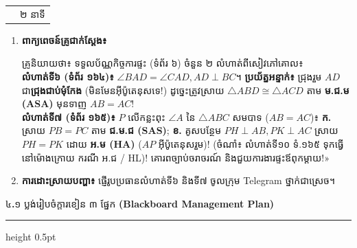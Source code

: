 \documentclass[a4paper,12pt]{article}
\makeatletter
\newcommand{\en}[1]{{\TimesEn #1}}
\newcommand{\enbf}[1]{{\TimesEn\textbf{#1}}}
\newcommand{\tri}[1]{\ensuremath{\triangle #1}}
\newcommand{\ang}[1]{\ensuremath{\angle #1}}
\newcommand{\cg}{\ensuremath{\cong}}
\newcommand{\subsectitle}[1]{{\muol\fontsize{11pt}{14.5pt}\selectfont #1}}
\newcommand{\subsec}[1]{%
  \needspace{1.6cm}%
  \vspace{4pt}%
  \subsectitle{#1}\par
  \vspace{2pt}\hrule height 0.5pt\vspace{3pt}%
}
\newenvironment{phasebox}[3]{%
  \par\needspace{2.4cm}%
  \begin{tcolorbox}[
    enhanced, sharp corners, colback=headgray, colframe=black,
    boxrule=1.0pt, top=3.5pt, bottom=3.5pt, left=8pt, right=8pt,
    before skip=5pt, after skip=3pt
  ]
    \linespread{1.0}\selectfont\renewcommand{\arraystretch}{1.0}%
    \begin{tabular*}{\linewidth}{@{}>{\raggedright\arraybackslash}p{13.10cm}@{\extracolsep{\fill}}r@{}}
      {\muol\fontsize{11pt}{14.5pt}\selectfont #1} & {\fontsize{10.5pt}{13.5pt}\selectfont\en{#2 |} #3}%
    \end{tabular*}%
  \end{tcolorbox}%
  \begingroup\fontsize{11.5pt}{14.92pt}\selectfont
}{%
  \par\endgroup
  \vspace{3pt}{\color{black}\hrule height 0.75pt}\vspace{5pt}%
}
\makeatother
\begin{document}
\begin{phasebox}{ជំហានទី ៥៖ កិច្ចការផ្ទះ \enbf{\#6, \#7} និងបណ្ដាំផ្ញើ}{48--50 min}{២ នាទី}
  \begin{enumerate}[leftmargin=0.45cm, topsep=1.5pt, itemsep=2.2pt, parsep=0pt]
    \item \textbf{ពាក្យពេចន៍គ្រូជាក់ស្ដែង៖}
      \begin{scriptbox}
        {\muol\fontsize{10.8pt}{14.5pt}\selectfont \enbf{«}គ្រូនិយាយថា៖} ទទួលប័ណ្ណកិច្ចការផ្ទះ (ទំព័រ ៦) ចំនួន ២ លំហាត់ពីសៀវភៅគោល៖\\
        \textbf{លំហាត់ទី៦ (ទំព័រ ១៦៤)៖} $\ang{BAD}=\ang{CAD}, AD\perp BC$។ \textbf{ប្រយ័ត្នអន្ទាក់៖} ជ្រុងរួម $AD$ ជា\textbf{ជ្រុងជាប់មុំកែង} (មិនមែនអ៊ីប៉ូតេនុសទេ!) ដូច្នេះត្រូវស្រាយ $\tri{ABD}\cg\tri{ACD}$ តាម \textbf{ម.ជ.ម (\en{ASA})} មុនទាញ $AB=AC$!\\
        \textbf{លំហាត់ទី៧ (ទំព័រ ១៦៥)៖} $P$ លើកន្លះពុះ $\ang{A}$ នៃ $\tri{ABC}$ សមបាទ ($AB=AC$)៖ \textbf{ក.} ស្រាយ $PB=PC$ តាម \textbf{ជ.ម.ជ (\en{SAS})}; \textbf{ខ.} គូសបន្ថែម $PH\perp AB, PK\perp AC$ ស្រាយ $PH=PK$ ដោយ \textbf{អ.ម (\en{HA})} ($AP$ អ៊ីប៉ូតេនុសរួម)! (ចំណាំ៖ លំហាត់ទី១០ ទំ.១៦៥ ទុកធ្វើនៅម៉ោងក្រោយ ករណី អ.ជ / \en{HL})! គោរពច្បាប់ចរាចរណ៍ និងជួយការងារផ្ទះឪពុកម្ដាយ!»
      \end{scriptbox}
    \item \textbf{ការដោះស្រាយបញ្ហា៖} ផ្ញើរូបប្រធានលំហាត់ទី៦ និងទី៧ ចូលក្រុម \en{Telegram} ថ្នាក់ជាស្រេច។
  \end{enumerate}
\end{phasebox}

\subsec{៤\enbf{.}១ ប្លង់រៀបចំក្ដារខៀន ៣ ផ្នែក \enbf{(Blackboard Management Plan)}}
\end{document}
